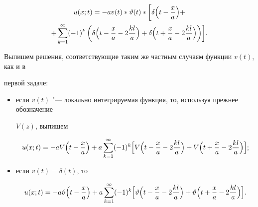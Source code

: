 \begin{multline}

\label{kogan:eq32}

u(x;t)=-av(t)\ast \vartheta (t)\ast \biggl[\delta \Bigl(t-\frac{x}{a}  \Bigr)+ \\

+

\sum\limits_{k=1}^\infty (-1)^k\left( 

\delta \Bigl( t-\frac{x}{a}-2\frac{kl}{a} \Bigr)+

\delta \Bigl( t+\frac{x}{a}-2\frac{kl}{a} \Bigr) \right)  

\biggr].

\end{multline}



Выпишем решения, соответствующие таким же частным случаям функции $v(t)$, как и в 

первой задаче: 



\begin{itemize}



\item[а)] если $v(t)$ "--- локально интегрируемая функция, то, используя прежнее обозначение 

$V(z)$, выпишем

$$

u(x;t)=-aV\Bigl(t-\frac{x}{a} \Bigr)+

a\sum\limits_{k=1}^\infty 

(-1)^k\Bigl[

V\Bigl(t-\frac{x}{a}-2\frac{kl}{a}\Bigr)+

V\Bigl(t+\frac{x}{a}-2\frac{kl}{a}\Bigr)\Bigr];

$$



\item[б)] если  $v(t)=\delta (t)$, то

$$

u(x;t)=-a\vartheta \Bigl(t-\frac{x}{a} \Bigr)+

a\sum\limits_{k=1}^\infty (-1)^k

\Bigl[

\vartheta \Bigl( t-\frac{x}{a}-2\frac{kl}{a}\Bigr)+

\vartheta \Bigl( t+\frac{x}{a}-2\frac{kl}{a}\Bigr) \Bigr].

$$



\end{itemize}



